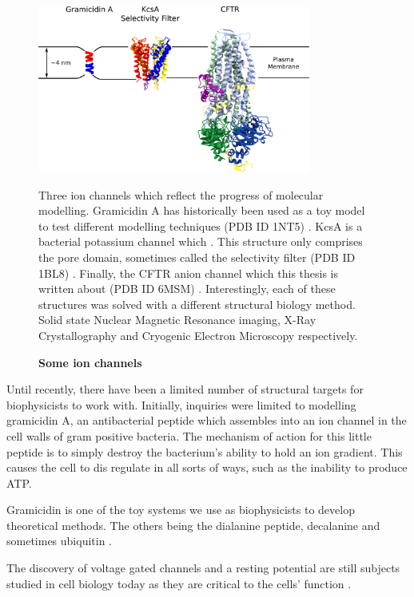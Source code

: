 \begin{figure}
	\begin{center}
		\includegraphics[width=0.8\textwidth]{figures/ion_channel_progression.pdf}
	\end{center}
	\captionsetup{singlelinecheck = false, justification=raggedright}
	\caption[Some ion channels] {\textbf{Some ion channels}}{Three ion channels which reflect the progress of molecular modelling. Gramicidin A has historically been used as a toy model to test different modelling techniques (PDB ID 1NT5) \cite{sham2003}. KcsA is a bacterial potassium channel which . This structure only comprises the pore domain, sometimes called the selectivity filter (PDB ID 1BL8) \cite{doyle1998}. Finally, the CFTR anion channel which this thesis is written about (PDB ID 6MSM) \cite{zhang2018a}. Interestingly, each of these structures was solved with a different structural biology method. Solid state Nuclear Magnetic Resonance imaging, X-Ray Crystallography and Cryogenic Electron Microscopy respectively.}
	\label{action_potential_graphic}
\end{figure}

Until recently, there have been a limited number of structural targets for biophysicists to work with. Initially, inquiries were limited to modelling gramicidin A, an antibacterial peptide which assembles into an ion channel in the cell walls of gram positive bacteria\cite{liou2015}. The mechanism of action for this little peptide is to simply destroy the bacterium's ability to hold an ion gradient. This causes the cell to dis regulate in all sorts of ways, such as the inability to produce ATP.

Gramicidin is one of the toy systems we use as biophysicists to develop theoretical methods. The others being the dialanine peptide, decalanine and sometimes ubiquitin \cite{}.

The discovery of voltage gated channels and a resting potential are still subjects studied in cell biology today as they are critical to the cells' function \cite{}.

